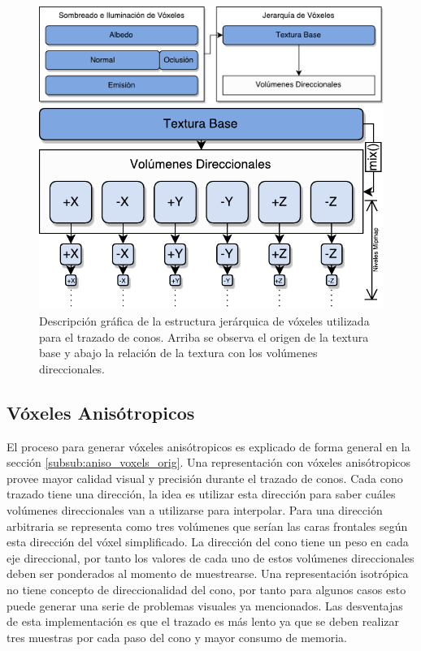 \begin{figure}[H]
    \centering
    \includegraphics[width=.8\linewidth]{media/representation.pdf}
    \par\bigskip
    \includegraphics[width=.8\linewidth]{media/hierarchy.pdf}
    \caption{Descripción gráfica de la estructura jerárquica de vóxeles utilizada para el trazado de conos. Arriba se observa el origen de la textura base y abajo la relación de la textura con los volúmenes direccionales.}
    \label{fig:hierarchy_impl}
\end{figure}

\subsection{Vóxeles Anisótropicos} %
\label{sub:voxeles_anisotropos}
El proceso para generar vóxeles anisótropicos es explicado de forma general en la sección \ref{subsub:aniso_voxels_orig}. Una representación con vóxeles anisótropicos provee mayor calidad visual y precisión durante el trazado de conos. Cada cono trazado tiene una dirección, la idea es utilizar esta dirección para saber cuáles volúmenes direccionales van a utilizarse para interpolar. Para una dirección arbitraria se representa como tres volúmenes que serían las caras frontales según esta dirección del vóxel simplificado. La dirección del cono tiene un peso en cada eje direccional, por tanto los valores de cada uno de estos volúmenes direccionales deben ser ponderados al momento de muestrearse. Una representación isotrópica no tiene concepto de direccionalidad del cono, por tanto para algunos casos esto puede generar una serie de problemas visuales ya mencionados. Las desventajas de esta implementación es que el trazado es más lento ya que se deben realizar tres muestras por cada paso del cono y mayor consumo de memoria.

